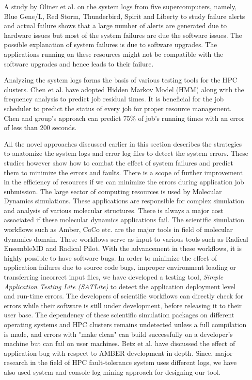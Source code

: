 \documentclass[10pt]{ruthesis}
\begin{document}
A study by Oliner et al. \cite{ref14} on the system logs from five supercomputers, namely, Blue Gene/L, Red Storm, Thunderbird, Spirit and Liberty to study failure alerts and actual failure shows that a large number of alerts are generated due to hardware issues but most of the system failures are due the software issues. The possible explanation of system failures is due to software upgrades. The applications running on these resources might not be compatible with the software upgrades and hence leads to their failure. 

Analyzing the system logs forms the basis of various testing tools for the HPC clusters. Chen et al. \cite{ref10} have adopted Hidden Markov Model (HMM) \cite{ref11} along with the frequency analysis to predict job residual times. It is beneficial for the job scheduler to predict the status of every job for proper resource management. Chen and group's approach can predict 75\% of job's running times with an error of less than 200 seconds.  

All the novel approaches discussed earlier in this section describes the strategies to anatomize the system logs and error log files to detect the system errors. These studies however show how to combat the effect of system failures and predict them to minimize the errors and faults. There is a scope of further improvement in the efficiency of resources if we can minimize the errors during application job submission. The large sector of computing resources is used by Molecular Dynamics simulations. These applications are responsible for complex simulation and analysis of various molecular structures. There is always a major cost associated if these molecular dynamics applications fail. The scientific simulation workflows such as Amber, CoCo etc. are the major tools in field of molecular dynamics domain. These workflows serve as input to various tools such as Radical EnsembleMD and Radical Pilot. With the advancement in these workflows, it is highly possible to have software bugs. In order to minimize the effect of application failures due to source code bugs, improper environment loading or transferring incorrect input files, we have developed a testing tool, \textit{Simple Application Testing Lite (SATLite)} to detect the application deployment level and run-time errors. The developers of scientific workflows can directly check for errors while their software is still under development, before releasing it to their user base. The dependency of these scientific simulation packages on different operating systems and HPC clusters remains undetected unless a full compilation is made, and errors with "make clean" \cite{ref16} can build successfully on a developer's machine but can fail on user machines. Betz et al. \cite{ref16} have discussed the effect of application bug with respect to AMBER development in depth. Since, major research in the field of HPC fault-tolerance system uses different logs, we have also used system and console log mining approach for designing our tool. 
\end{document}
